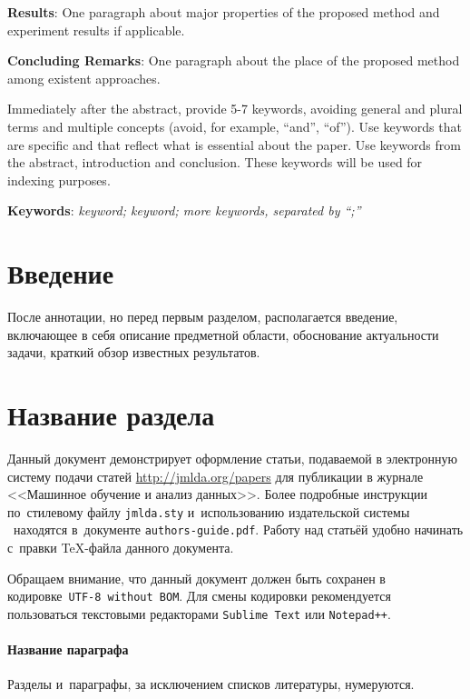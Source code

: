 \documentclass[12pt, twoside]{article}
\begin{document}
{	\noindent
	\textbf{Results}: One paragraph about major properties of the proposed method and experiment results if applicable.
	
	\noindent
	\textbf{Concluding Remarks}: One paragraph about the place of the proposed method among existent approaches.
		
	\noindent
	Immediately after the abstract, provide 5-7 keywords, avoiding general and plural terms and multiple concepts (avoid, for example, ``and'', ``of'').
	Use keywords that are specific and that reflect what is essential about the paper.
	Use keywords from the abstract, introduction and conclusion.
	These keywords will be used for indexing purposes.
		
	\noindent
    	\textbf{Keywords}: \emph{keyword; keyword; more keywords, separated by ``;''}}


\maketitle
\linenumbers

\section{Введение}
После аннотации, но перед первым разделом,
располагается введение, включающее в себя
описание предметной области,
обоснование актуальности задачи,
краткий обзор известных результатов.

\section{Название раздела}
Данный документ демонстрирует оформление статьи,
подаваемой в электронную систему подачи статей \url{http://jmlda.org/papers} для публикации в журнале <<Машинное обучение и анализ данных>>.
Более подробные инструкции по~стилевому файлу \texttt{jmlda.sty} и~использованию издательской системы \LaTeXe\
находятся в~документе \texttt{authors-guide.pdf}.
Работу над статьёй удобно начинать с~правки \TeX-файла данного документа.

Обращаем внимание, что данный документ должен быть сохранен в кодировке~\verb'UTF-8 without BOM'.
Для смены кодировки рекомендуется пользоваться текстовыми редакторами \verb'Sublime Text' или \verb'Notepad++'.

\paragraph{Название параграфа}
Разделы и~параграфы, за исключением списков литературы, нумеруются.
\end{document}
